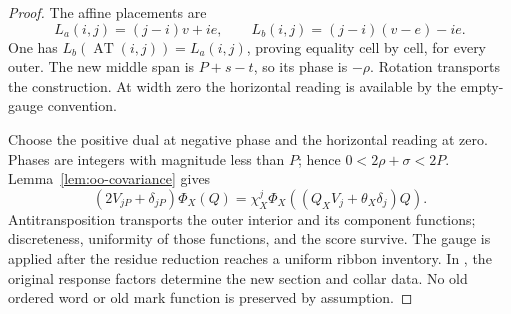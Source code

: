 \documentclass[11pt,a4paper]{amsart}
\numberwithin{equation}{section}
\theoremstyle{plain}
\theoremstyle{definition}
\begin{document}
\begin{proof}
The affine placements are
\[
 L_a(i,j)=(j-i)v+ie,\qquad
 L_b(i,j)=(j-i)(v-e)-ie.
\]
One has \(L_b(\operatorname{AT}(i,j))=L_a(i,j)\), proving equality cell by cell, for every outer.  The new middle span is \(P+s-t\), so its phase is \(-\rho\).  Rotation transports the construction.  At width zero the horizontal reading is available by the empty-gauge convention.

Choose the positive dual at negative phase and the horizontal reading at zero.  Phases are integers with magnitude less than \(P\); hence \(0<2\rho+\sigma<2P\).  Lemma~\ref{lem:oo-covariance} gives
\[
 (2V_{jP}+\delta_{jP})\Phi_X(Q)
 =\chi_X^j\Phi_X((Q_XV_j+\theta_X\delta_j)Q).
\]
Antitransposition transports the outer interior and its component functions; discreteness, uniformity of those functions, and the score survive.  The gauge is applied after the residue reduction reaches a uniform ribbon inventory.  In , the original response factors determine the new section and collar data.  No old ordered word or old mark function is preserved by assumption.
\end{proof}
\end{document}
